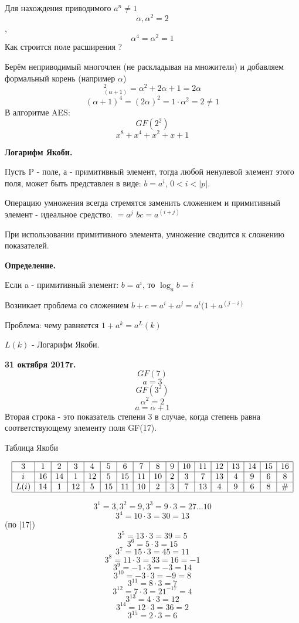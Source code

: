 \documentclass{article}
\begin{document}
Для нахождения приводимого $a^n\ne 1$
$$\alpha, \alpha^2 = 2$$,
$$\alpha^4=\alpha^2=1$$
Как строится поле расширения ?

Берём неприводимый многочлен (не раскладывая на множители) и добавляем формальный корень (например $\alpha$)
$$_(\alpha+1)^2=\alpha^2+2\alpha+1=2\alpha$$
$$(\alpha+1)^4=(2\alpha)^2=1\cdot \alpha^2=2\ne 1$$
В алгоритме AES:
$$GF(2^2)$$
$$x^8+x^4+x^2+x+1$$

{\bf Логарифм Якоби.}

Пусть P - поле, а - примитивный элемент, тогда любой ненулевой элемент этого поля, может быть представлен в виде: $b=a^i$, $0<i<|p|$.

Операцию умножения всегда стремятся заменить сложением и примитивный элемент - идеальное средство. $=a^j$ $bc=a^(i+j)$

При использовании примитивного элемента, умножение сводится к сложению показателей.

{\bf Определение.}

Если a - примитивный элемент: $b=a^i$, то $\log_a b = i$

Возникает проблема со сложением $b+c=a^i+a^j=a^i(1+a^(j-i)$

Проблема: чему равняется $1+a^k=a^L(k)$

$L(k)$ - Логарифм Якоби.

\textbf {31 октября 2017г.}
$$GF(7)$$
$$a=3$$
$$GF(3^2)$$
$$\alpha^2=2$$
$$a=\alpha+1$$
Вторая строка - это показатель степени 3 в случае, когда степень равна соответствующему элементу поля GF(17).

\begin{center}
  Таблица Якоби
\end{center}

$$\begin{array}{|c|c|c|c|c|c|c|c|c|c|c|c|c|c|c|c|c|}
   \hline
   3 & 1 & 2 & 3 & 4 & 5 & 6 & 7 & 8 & 9 & 10 & 11 & 12 & 13 & 14 & 15 & 16 \\
   \hline
   i & 16 & 14 & 1 & 12 & 5 & 15 & 11 & 10 & 2 & 3 & 7 & 13 & 4 & 9 & 6 & 8 \\
   \hline
   L(i) & 14 & 1 & 12 & 5 & 15 & 11 & 10 & 2 & 3 & 7 & 13 & 4 & 9 & 6 & 8 & \# \\
   \hline
\end{array}$$

$$3^1=3, 3^2=9, 3^3=9\cdot 3 = 27\ldots 10$$
$$3^4=10\cdot 3=30=13$$ (по |17|)
$$3^5=13\cdot 3=39=5$$
$$3^6=5\cdot 3=15$$
$$3^7=15\cdot 3=45=11$$
$$3^8=11\cdot 3=33=16=-1$$
$$3^9=-1\cdot 3=-3=14$$
$$3^{10}=-3\cdot 3=-9 = 8$$
$$3^{11}=8\cdot 3=7$$
$$3^{12}=7\cdot 3=21^{-17}=4$$
$$3^{13}=4\cdot 3=12$$
$$3^{14}=12\cdot 3=36=2$$
$$3^{15}=2\cdot 3=6$$
\end{document}

